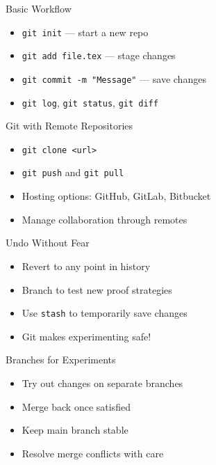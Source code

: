 \documentclass[12pt,t]{beamer}
\begin{document}
\begin{frame}{Basic Workflow}
\begin{itemize}
    \item \texttt{git init} --- start a new repo
		\pause
    \item \texttt{git add file.tex} --- stage changes
		\pause
    \item \texttt{git commit -m "Message"} --- save changes
		\pause
    \item \texttt{git log}, \texttt{git status}, \texttt{git diff}
\end{itemize}
\end{frame}

\begin{frame}{Git with Remote Repositories}
\begin{itemize}
    \item \texttt{git clone <url>}
		\pause
    \item \texttt{git push} and \texttt{git pull}
		\pause
    \item Hosting options: GitHub, GitLab, Bitbucket
		\pause
    \item Manage collaboration through remotes
\end{itemize}
\end{frame}

\begin{frame}{Undo Without Fear}
\begin{itemize}
    \item Revert to any point in history
		\pause
    \item Branch to test new proof strategies
		\pause
    \item Use \texttt{stash} to temporarily save changes
		\pause
    \item Git makes experimenting safe!
		\pause
\end{itemize}
\end{frame}

\begin{frame}{Branches for Experiments}
\begin{itemize}
    \item Try out changes on separate branches
		\pause
    \item Merge back once satisfied
		\pause
    \item Keep main branch stable
		\pause
    \item Resolve merge conflicts with care
\end{itemize}
\end{frame}
\end{document}
